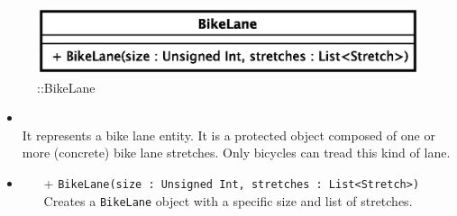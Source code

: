 \begin{figure}[h]
\centering
\includegraphics[scale=0.6,keepaspectratio]{images/solution/bike_lane.eps}
\caption{\pReactiveComponentLane::BikeLane}
\label{fig:sd-app-bike_lane}
\end{figure}
\FloatBarrier
\begin{itemize}
  \item \textbf{\descr} \\
    It represents a bike lane entity. It is a protected object composed of
    one or more (concrete) bike lane stretches. Only bicycles can tread this
    kind of lane.
  \item \textbf{\ops}
  \begin{itemize}
  \item[+] \texttt{BikeLane(size : Unsigned Int, stretches : List<Stretch>)} \\
  Creates a \texttt{BikeLane} object with a specific size and list of stretches.
  \end{itemize} 
\end{itemize}
